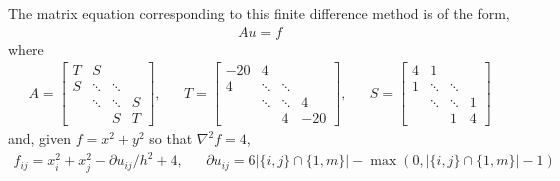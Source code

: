 \documentclass[10pt]{article}
\begin{document}
\begin{solution}[Solution]
The matrix equation corresponding to this finite difference method is of the form,
\begin{align*}
    Au = f
\end{align*}
where
\begin{align*}
    A = \left[\begin{array}{cccc}
    T & S\\
        S &\ddots & \ddots \\
    & \ddots & \ddots & S\\
    & & S & T
    \end{array}\right]
    , &&
    T = \left[\begin{array}{cccc}
    -20 & 4 \\
        4 & \ddots & \ddots \\
        & \ddots & \ddots & 4\\
    & & 4 & -20\end{array}\right]
    ,&& S = \left[\begin{array}{cccc}
    4 & 1 \\
        1 & \ddots & \ddots \\
        & \ddots & \ddots & 1\\
    & & 1 & 4\end{array}\right]
\end{align*}
and, given \( f = x^2+y^2 \) so that \( \nabla^2 f = 4 \),
\begin{align*}
    f_{ij} = x_i^2+x_j^2 - \partial u_{ij}/h^2 + 4, &&
    \partial u_{ij} = 6|\{i,j\}\cap\{1,m\}| - \max(0,|\{i,j\} \cap \{1,m\}|-1)
\end{align*}

\end{solution}
\end{document}
